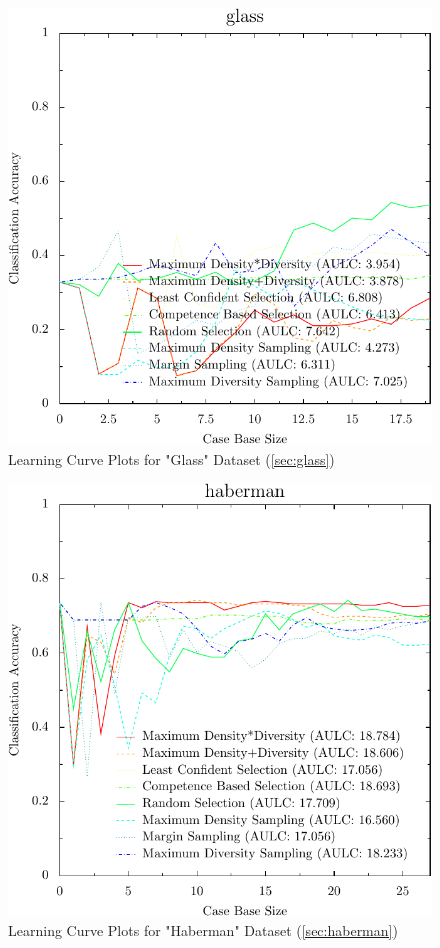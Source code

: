 \documentclass[a4paper,11pt]{report}
\begin{document}
\begin{figure}[h!]
\includegraphics{./Plots/glass}
\caption{Learning Curve Plots for "Glass" Dataset (\ref{sec:glass})}
\end{figure}

\begin{figure}[h!]
\includegraphics{./Plots/haberman}
\caption{Learning Curve Plots for "Haberman" Dataset (\ref{sec:haberman})}
\end{figure}
\end{document}
